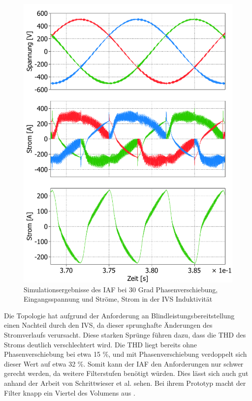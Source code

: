 \begin{figure}
	\centering
	\includegraphics[width=1\linewidth]{content/Grafiken/IAF_AC+L_30Grad}
	\caption{Simulationsergebnisse des IAF bei 30 Grad Phasenverschiebung, Eingangsspannung und Ströme, Strom in der IVS Induktivität }
	\label{fig:iafacl30grad}
\end{figure}
Die Topologie hat aufgrund der Anforderung an Blindleistungsbereitstellung einen Nachteil durch den IVS, da dieser sprunghafte Änderungen des Stromverlaufs verursacht. Diese starken Sprünge führen dazu, dass die THD des Stroms deutlich verschlechtert wird. Die THD liegt bereits ohne Phasenverschiebung bei etwa 15 \%, und mit Phasenverschiebung verdoppelt sich dieser Wert auf etwa 32 \%.  Somit kann der IAF den Anforderungen nur schwer gerecht werden, da weitere Filterstufen benötigt würden. Dies lässt sich auch gut anhand der Arbeit von Schrittwieser et al. sehen. Bei ihrem Prototyp macht der Filter knapp ein Viertel des Volumens aus \cite{IAF99}.